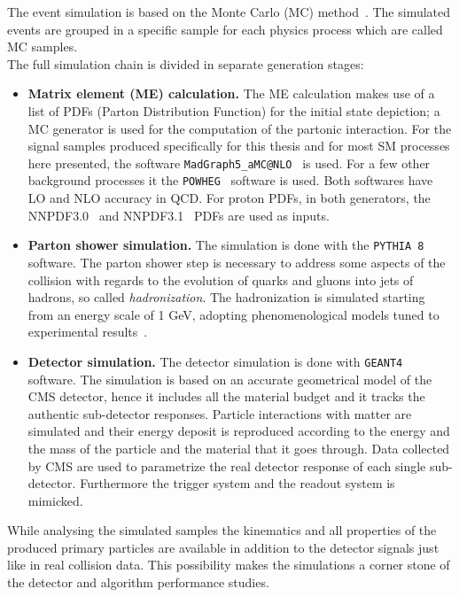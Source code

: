 The event simulation is based on the Monte Carlo (MC)
method~\cite{mc}. The simulated events
 are grouped in a specific
sample for each physics process which are called MC samples.\\
The full simulation chain is divided in separate generation stages:
\begin{itemize}
\setlength\itemsep{-0.1em}
\item \textbf{Matrix element (ME) calculation.} The ME calculation
  makes use of a list of PDFs (Parton Distribution Function) for the initial state
  depiction; a MC generator is used for the computation of the
  partonic interaction.
 For the signal samples produced specifically for this thesis and for
  most SM processes here presented, the software
  \texttt{MadGraph5\_aMC@NLO}~\cite{Alwall_2014} is used. For a few other background processes it
  the \texttt{POWHEG}~\cite{Alioli_2010} software is used. Both
  softwares have LO and NLO accuracy in QCD. For proton PDFs, in both
  generators, the NNPDF3.0~\cite{Ball_2015} and
  NNPDF3.1~\cite{Ball_2017} PDFs are used as inputs.
\item \textbf{Parton shower simulation.} The simulation is done with
  the \texttt{PYTHIA 8}~\cite{Sj_strand_2008, Sj_strand_2015}
  software. The parton shower step is necessary to address some aspects
  of the collision with regards to the evolution of quarks and gluons into jets of
  hadrons, so called \emph{hadronization}. The hadronization is
  simulated starting from an energy scale of 1 GeV, adopting phenomenological models tuned to
  experimental results~\cite{Skands_2014, Khachatryan_2016_ps, Sirunyan_2020_ps}.
\item \textbf{Detector simulation.} The detector simulation is done
  with \texttt{GEANT4}~\cite{AGOSTINELLI2003250} software. The
  simulation is based on an accurate geometrical model of the CMS
  detector, hence it includes all the material budget and it tracks
  the authentic sub-detector responses. Particle interactions with
  matter are simulated and their energy deposit is reproduced according to the
  energy and the mass of the particle and the material that it goes through. Data collected by CMS are used to
  parametrize the real detector response of each single
  sub-detector. Furthermore the trigger system and the readout system
  is mimicked. 
\end{itemize}

While analysing the simulated samples the kinematics and all
properties of the produced primary particles are available in addition
to the detector signals just like in real collision data. This
possibility makes the simulations a corner stone of the detector and
algorithm performance studies.

